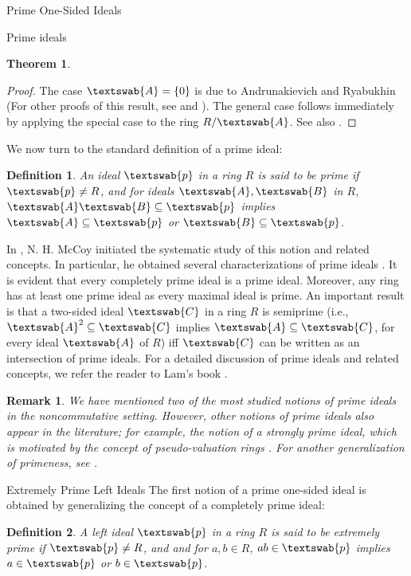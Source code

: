 \documentclass[11pt,a4paper]{article}
\theoremstyle{theorem}
\newtheorem{theorem}{Theorem}[section]
\newtheorem{definition}{Definition}[section]
\newtheorem{remark}{Remark}[section]
\numberwithin{equation}{section}
\begin{document}
\begin{section}{Prime One-Sided Ideals}
\begin{subsection}{Prime ideals}
\begin{theorem}
		\end{theorem}
		\begin{proof}
			The case \( \textswab{A} =\{0\} \) is due to Andrunakievich and Ryabukhin \cite{andrunakievic1968rings} (For other proofs of this result, see \cite{klein1980simple} and \cite[Theorem 12.7]{lam2001afirst}). The general case follows immediately by applying the special case to the ring \( R / \textswab{A} \). See also \cite[p. 195]{lam2001afirst}.
		\end{proof}
		We now turn to the standard definition of a prime ideal:
		\begin{definition}\label{def: prime ideal}
			An ideal  \( \textswab{p} \) in a  ring \( R \) is said to be \emph{prime} if \( \textswab{p} \neq R \), and for ideals \( \textswab{A},\textswab{B}\) in \(R\), \( \textswab{A}\textswab{B}\subseteq\textswab{p}\) implies \( \textswab{A}\subseteq\textswab{p}\) or \( \textswab{B}\subseteq\textswab{p}\).
		\end{definition}
		 In  \cite{McCoy1949prime}, N. H. McCoy initiated the systematic study of this notion and related concepts. In particular, he obtained several characterizations of prime ideals \cite[Theorem 1]{McCoy1949prime}. It is evident that every completely prime ideal is a prime ideal. Moreover, any ring has at least one prime ideal as every maximal ideal is prime.   An important result is that a two-sided ideal \( \textswab{C} \) in a  ring \( R \) is semiprime (i.e.,  \( \textswab{A}^2\subseteq\textswab{C}\) implies \( \textswab{A}\subseteq\textswab{C}\), for every ideal \(\textswab{A}\) of  \(R\)) iff \( \textswab{C} \) can be written as an intersection of prime ideals. For a detailed discussion of prime ideals and related concepts, we refer the reader to Lam's book \cite[Chapter 4]{lam2001afirst}. 
	 \begin{remark}
		We have mentioned two of the most studied notions of prime ideals in the noncommutative setting. However, other notions of prime ideals also appear in the literature; for example, the notion of a strongly prime ideal, which is motivated by the concept of pseudo-valuation rings \cite{hedstrom1978pseudo}. For another generalization of primeness, see \cite{murata1969generalization}.
	\end{remark}
	\end{subsection}

 \begin{subsection}{Extremely Prime Left Ideals}
 	The first notion of a prime one-sided ideal is obtained by generalizing the concept of a completely prime ideal:
 	\begin{definition}\label{def: extremely prime left ideal}
 		A left ideal  \( \textswab{p} \) in a  ring \( R \) is said to be \emph{extremely prime} if \( \textswab{p} \neq R \), and  and for \( a,b\in R\), \( ab\in \textswab{p}\) implies \( a\in \textswab{p}\) or \( b\in \textswab{p}\). 
 	\end{definition}
 	

\end{subsection}
\end{section}
\end{document}

